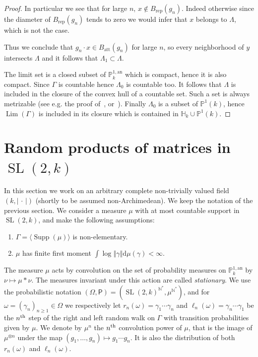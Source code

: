 \documentclass[AHL,Unicode,longabstracts]{cedram}
\DeclareMathOperator{\supp}{Supp}
\DeclareMathOperator{\Lm}{Lim}
\DeclareMathOperator{\SL}{SL}
\newcommand{\nn}{\mathbb{N}}
\newcommand{\hh}{\mathbb{H}}
\newcommand{\prob}{\mathsf{P}}
\newcommand{\an}{\mathrm{an}}
\newcommand{\om}{\Omega}
\newcommand{\norm}[1]{\left\Vert#1\right\Vert}
\newcommand{\abs}[1]{\left\vert#1\right\vert}
\newcommand{\PP}{\mathbb{P}}
\newcommand{\berk}{{\mathbb{P}^{1, \mathrm{an}}_k}}
\newcommand{\att}{\mathrm{att}}
\newcommand{\rep}{\mathrm{rep}}
\newcommand{\SLk}{\SL(2,k)}
\newcommand*{\dd}{\mathrm{d}}
\newcommand*{\dmu}{\dd \mu}
\begin{document}
\begin{proof}
In particular we see that for large $n$, $x\notin B_{\rep}(g_n)$. Indeed otherwise since the diameter of $B_{\rep}(g_n)$ tends to zero we would infer that $x$ belongs to $\Lambda$, which is not the case.

Thus we conclude that $g_n\cdot x\in B_{\att}(g_n)$ for large $n$, so every neighborhood of $y$ intersects $\Lambda$ and it follows that $\Lambda_1\subset\Lambda$.


The limit set is a closed subset of $\PP^{1,\an}_k$ which is compact, hence it is also compact. Since $\Gamma$ is countable hence $\Lambda_0$ is countable too. It follows that $\Lambda$ is included in the closure of the convex hull of a countable set. Such a set is always metrizable (see e.g. the proof of~\cite[Lem.~7.15]{valtree}, or~\cite[Lem.~5.7]{baker-rumely}). Finally $\Lambda_0$ is a subset of $\PP^1(k)$, hence $\Lm(\Gamma)$ is included in its closure which is contained in $\hh_k \cup \PP^1(k)$.
\end{proof}


\section{Random products of matrices in \texorpdfstring{$\SLk$}{SLk}}\label{sec:furstenberg}

In this section we work on an arbitrary complete non-trivially valued field $(k, \abs{{\,\cdot\,}})$ (shortly to be assumed non-Archimedean). We keep the notation of the previous section. We consider a measure $\mu$ with at most countable support in $\SLk$, and make the following assumptions:
\begin{enumerate}\renewcommand{\theenumi}{B\arabic{enumi}}
\item \label{B1} $\Gamma = \langle \supp(\mu) \rangle$ is non-elementary.
\item \label{B2} $\mu$ has finite first moment $ \int \log \norm{\gamma} \dmu(\gamma)<\infty$.
\end{enumerate}

The measure $\mu$ acts by convolution on the set of probability measures on $\berk$ by $\nu \mapsto \mu \ast \nu$. The measures invariant under this action are called \emph{stationary}. We use the probabilistic notation $(\om, \prob) = (\SLk^{\nn^*}, \mu^{\nn^*})$, and for $\omega = (\gamma_n)_{n\geq 1}\in \om$ we respectively let $r_n(\omega) = \gamma_1\cdots \gamma_n$ and $\ell_n(\omega) = \gamma_n\cdots \gamma_1$ be the $n^{\rm th}$ step of the right and left random walk on $\Gamma$ with transition probabilities given by $\mu$. We denote by $\mu^n$ the $n^{\rm th}$ convolution power of $\mu$, that is the image of $\mu^ {\otimes n}$ under the map $(g_1, \ldots,g_n)\mapsto g_1\cdots g_n$. It is also the distribution of both $r_n(\omega)$ and $\ell_n(\omega)$.
\end{document}
